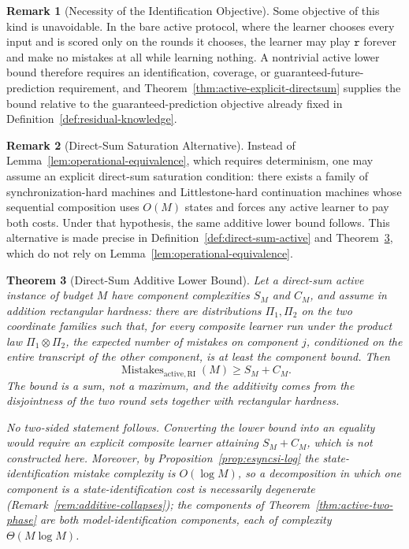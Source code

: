 \documentclass[12pt]{article}
\newtheorem{theorem}{Theorem}[section]
\theoremstyle{definition}
\newtheorem{remark}[theorem]{Remark}
\newcommand{\MistRI}{\operatorname{Mistakes}_{\mathrm{active,RI}}}
\begin{document}
\begin{remark}[Necessity of the Identification Objective]
\label{rem:active-objective-needed}
Some objective of this kind is unavoidable.  In the bare active protocol, where
the learner chooses every input and is scored only on the rounds it chooses, the
learner may play $\mathtt r$ forever and make no mistakes at all while learning
nothing.  A nontrivial active lower bound therefore requires an identification,
coverage, or guaranteed-future-prediction requirement, and
Theorem~\ref{thm:active-explicit-directsum} supplies the bound relative to the
guaranteed-prediction objective already fixed in
Definition~\ref{def:residual-knowledge}.
\end{remark}

\begin{remark}[Direct-Sum Saturation Alternative]
\label{rem:direct-sum-saturation}
Instead of Lemma~\ref{lem:operational-equivalence}, which requires
determinism, one may assume an
explicit direct-sum saturation condition: there exists a family of
synchronization-hard machines and Littlestone-hard continuation machines whose
sequential composition uses $O(M)$ states and forces any active learner to pay
both costs.  Under that hypothesis, the same additive lower bound follows.
This alternative is made precise in
Definition~\ref{def:direct-sum-active} and
Theorem~\ref{thm:active-direct-sum}, which do not rely on
Lemma~\ref{lem:operational-equivalence}.
\end{remark}

\begin{theorem}[Direct-Sum Additive Lower Bound]
\label{thm:active-direct-sum}
Let a direct-sum active instance of budget $M$ have component complexities
$S_M$ and $C_M$, and assume in addition \emph{rectangular hardness}: there are
distributions $\Pi_1,\Pi_2$ on the two coordinate families such that, for every
composite learner run under the product law $\Pi_1\otimes\Pi_2$, the expected
number of mistakes on component $j$, conditioned on the entire transcript of
the other component, is at least the component bound.  Then
\[
\MistRI(M)
\ge
S_M+C_M.
\]
The bound is a sum, not a maximum, and the additivity comes from the
disjointness of the two round sets together with rectangular hardness.

No two-sided statement follows.  Converting the lower bound into an equality
would require an explicit composite learner attaining $S_M+C_M$, which is not
constructed here.  Moreover, by Proposition~\ref{prop:esyncsi-log} the
state-identification mistake complexity is $O(\log M)$, so a
decomposition in which one component is a state-identification cost is
necessarily degenerate (Remark~\ref{rem:additive-collapses}); the components of
Theorem~\ref{thm:active-two-phase} are both model-identification components,
each of complexity $\Theta(M\log M)$.
\end{theorem}
\end{document}
